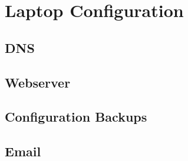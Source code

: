 \documentclass{report}
\begin{document}
\chapter{Laptop Configuration}
\section{DNS}
\section{Webserver}
\section{Configuration Backups}
\section{Email}
\end{document}
